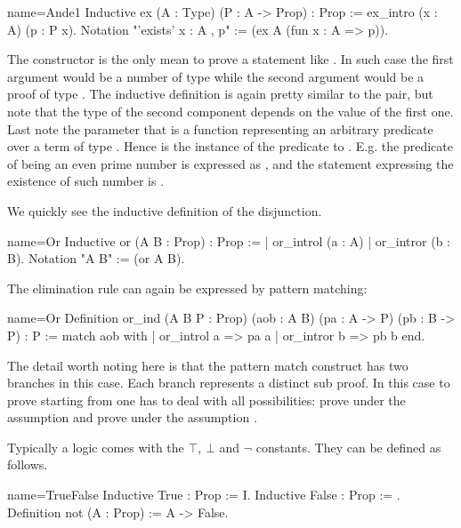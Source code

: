 \begin{coq}{name=Ande1}{}
Inductive ex (A : Type) (P : A -> Prop) : Prop :=
  ex_intro (x : A) (p : P x).
Notation "'exists' x : A , p" := (ex A (fun x : A => p)).
\end{coq}

The  constructor is the only mean to prove a statement like
.  In such case the first argument would be a number
 of type  while the second argument would be a proof  of type
.  The  inductive definition is again pretty similar to the
pair, but note that the type of the second component depends on the value of
the first one.  Last note the parameter  that is a function
representing an arbitrary predicate over a term of
type .  Hence  is the instance of the predicate to .  E.g.
the predicate of being an even prime number is expressed as
, and the statement expressing the
existence of such number is
.

We quickly see the inductive definition of the disjunction.

\begin{coq}{name=Or}{}
Inductive or (A B : Prop) : Prop :=
  | or_introl (a : A)
  | or_intror (b : B).
Notation "A \/ B" := (or A B).
\end{coq}

The elimination rule can again be expressed by pattern matching:

\begin{coq}{name=Or}{}
Definition or_ind (A B P : Prop)
  (aob : A \/ B) (pa : A -> P) (pb : B -> P) : P :=
  match aob with
  | or_introl a => pa a
  | or_intror b => pb b
  end.
\end{coq}

The detail worth noting here is that the pattern match construct has two
branches in this case.  Each branch represents a distinct sub proof.  In this
case to prove  starting from  one has to deal with all
possibilities: prove  under the assumption  and prove 
under the assumption .

Typically a logic comes with the $\top$, $\bot$ and $\neg$ constants.
They can be defined as follows.

\begin{coq}{name=TrueFalse}{}
Inductive True : Prop := I.
Inductive False : Prop := .
Definition not (A : Prop) := A -> False.
\end{coq}

